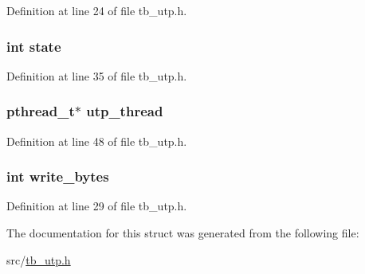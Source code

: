 Definition at line 24 of file tb\-\_\-utp.\-h.

\hypertarget{structtb__utp__t_a89f234133d3efe315836311cbf21c64b}{
\subsubsection[{state}]{\setlength{\rightskip}{0pt plus 5cm}int state}}\label{structtb__utp__t_a89f234133d3efe315836311cbf21c64b}


Definition at line 35 of file tb\-\_\-utp.\-h.

\hypertarget{structtb__utp__t_aa0eb12bac5ef0d83e6689f3b547b695d}{
\subsubsection[{utp\-\_\-thread}]{\setlength{\rightskip}{0pt plus 5cm}pthread\-\_\-t$\ast$ utp\-\_\-thread}}\label{structtb__utp__t_aa0eb12bac5ef0d83e6689f3b547b695d}


Definition at line 48 of file tb\-\_\-utp.\-h.

\hypertarget{structtb__utp__t_a814ec097a6a396e10f9f0924e924684e}{
\subsubsection[{write\-\_\-bytes}]{\setlength{\rightskip}{0pt plus 5cm}int write\-\_\-bytes}}\label{structtb__utp__t_a814ec097a6a396e10f9f0924e924684e}


Definition at line 29 of file tb\-\_\-utp.\-h.



The documentation for this struct was generated from the following file\-:\begin{DoxyCompactItemize}
\item 
src/\hyperlink{tb__utp_8h}{tb\-\_\-utp.\-h}\end{DoxyCompactItemize}
